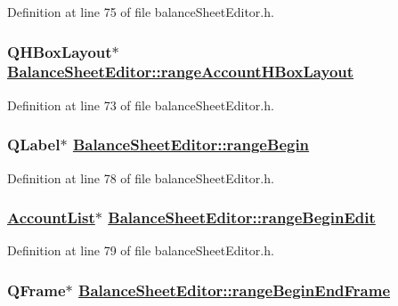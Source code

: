 Definition at line 75 of file balance\-Sheet\-Editor.h.\hypertarget{classBalanceSheetEditor_r16}{
\subsubsection[rangeAccountHBoxLayout]{\setlength{\rightskip}{0pt plus 5cm}QHBox\-Layout$\ast$ \hyperlink{classBalanceSheetEditor_r16}{Balance\-Sheet\-Editor::range\-Account\-HBox\-Layout}}}
\label{classBalanceSheetEditor_r16}


Definition at line 73 of file balance\-Sheet\-Editor.h.\hypertarget{classBalanceSheetEditor_r21}{
\subsubsection[rangeBegin]{\setlength{\rightskip}{0pt plus 5cm}QLabel$\ast$ \hyperlink{classBalanceSheetEditor_r21}{Balance\-Sheet\-Editor::range\-Begin}}}
\label{classBalanceSheetEditor_r21}


Definition at line 78 of file balance\-Sheet\-Editor.h.\hypertarget{classBalanceSheetEditor_r22}{
\subsubsection[rangeBeginEdit]{\setlength{\rightskip}{0pt plus 5cm}\hyperlink{classAccountList}{Account\-List}$\ast$ \hyperlink{classBalanceSheetEditor_r22}{Balance\-Sheet\-Editor::range\-Begin\-Edit}}}
\label{classBalanceSheetEditor_r22}


Definition at line 79 of file balance\-Sheet\-Editor.h.\hypertarget{classBalanceSheetEditor_r19}{
\subsubsection[rangeBeginEndFrame]{\setlength{\rightskip}{0pt plus 5cm}QFrame$\ast$ \hyperlink{classBalanceSheetEditor_r19}{Balance\-Sheet\-Editor::range\-Begin\-End\-Frame}}}
\label{classBalanceSheetEditor_r19}


